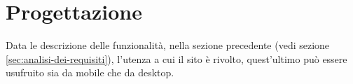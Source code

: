 \section{Progettazione}
\label{sec:progettazione}

Data le descrizione delle funzionalità, nella sezione precedente (vedi sezione \ref{sec:analisi-dei-requisiti}), l'utenza a cui il sito è rivolto, quest'ultimo può essere usufruito sia da mobile che da desktop.\\ 